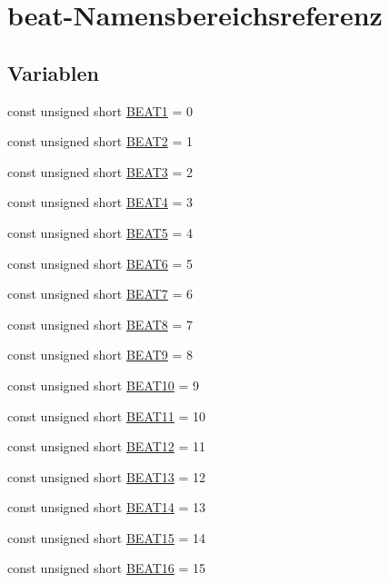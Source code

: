 \hypertarget{namespacebeat}{}\section{beat-\/\+Namensbereichsreferenz}
\label{namespacebeat}
\subsection*{Variablen}
\begin{DoxyCompactItemize}
\item 
const unsigned short \hyperlink{namespacebeat_ae859561033de8f2140542a8bea7d5f02}{B\+E\+A\+T1} = 0
\item 
const unsigned short \hyperlink{namespacebeat_a219eb8f5f0218df3af3f4d4d9214327f}{B\+E\+A\+T2} = 1
\item 
const unsigned short \hyperlink{namespacebeat_a0ccf0d5bdc6dfdae1fd7b1667655a18f}{B\+E\+A\+T3} = 2
\item 
const unsigned short \hyperlink{namespacebeat_acb66407079f4f750c8edf7c1bd8519df}{B\+E\+A\+T4} = 3
\item 
const unsigned short \hyperlink{namespacebeat_a1707525607992183af84b75b13bdcf1c}{B\+E\+A\+T5} = 4
\item 
const unsigned short \hyperlink{namespacebeat_a38be39fd5d7424553131d77620a5fbfc}{B\+E\+A\+T6} = 5
\item 
const unsigned short \hyperlink{namespacebeat_af4ce75f48a22e0f3aacded8385030cad}{B\+E\+A\+T7} = 6
\item 
const unsigned short \hyperlink{namespacebeat_a564212b647573e2f3fce876049227d2c}{B\+E\+A\+T8} = 7
\item 
const unsigned short \hyperlink{namespacebeat_a6558138490436cdf9a77d90ffd07e092}{B\+E\+A\+T9} = 8
\item 
const unsigned short \hyperlink{namespacebeat_abd0eb0f3160a3579b574ffa8bf94282c}{B\+E\+A\+T10} = 9
\item 
const unsigned short \hyperlink{namespacebeat_a4ba76b47d18db4674af1ca28136614e2}{B\+E\+A\+T11} = 10
\item 
const unsigned short \hyperlink{namespacebeat_ae84780c2b37cac562b4f9e7676d7a715}{B\+E\+A\+T12} = 11
\item 
const unsigned short \hyperlink{namespacebeat_a0056cac49aa9cd40c0532068b40322fe}{B\+E\+A\+T13} = 12
\item 
const unsigned short \hyperlink{namespacebeat_aa25c9d3e796af023ea86fc1181ff4732}{B\+E\+A\+T14} = 13
\item 
const unsigned short \hyperlink{namespacebeat_a241a13409659dff75e5368358447fc73}{B\+E\+A\+T15} = 14
\item 
const unsigned short \hyperlink{namespacebeat_ad619f02c1a78c30570d7371411f1ef47}{B\+E\+A\+T16} = 15
\end{DoxyCompactItemize}



